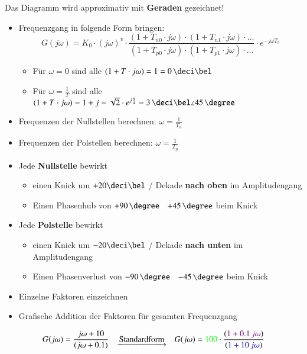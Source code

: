 Das Diagramm wird approximativ mit \textbf{Geraden} gezeichnet!

\begin{itemize}
    \item Frequenzgang in folgende Form bringen:
        $$ G(j \omega) = K_0 \cdot (j \omega)^v \cdot \frac{(1 + T_{n0} \cdot j \omega)\cdot (1 + T_{n1} \cdot j \omega) \cdot \ldots}
        {(1 + T_{p0} \cdot j \omega)\cdot (1 + T_{p1} \cdot j \omega) \cdot \ldots} \cdot e^{- j \omega T_t} $$
    \begin{itemize}
        \item Für $\omega = 0$ sind alle $(1 + T \cdot j \omega) = 1 = 0 \, \deci \bel$
        \item Für $\omega = \frac{1}{T}$ sind alle  $(1 + T \cdot j \omega) = 1 + j = \sqrt{2} \cdot e^{j \frac{\pi}{4}} 
            = 3 \, \deci \bel \angle 45 \, \degree$
    \end{itemize}
    \item Frequenzen der Nullstellen berechnen: $\omega = \frac{1}{T_n}$
    \item Frequenzen der Polstellen berechnen: $\omega = \frac{1}{T_p}$


    \item Jede \textbf{Nullstelle} bewirkt
    \begin{itemize}
        \item einen Knick um $+ 20 \deci \bel$ / Dekade \textbf{nach oben} im Amplitudengang
        \item Einen Phasenhub von $+ 90 \, \degree$ \textrightarrow\ $+ 45 \, \degree$ beim Knick
    \end{itemize}
    \item Jede \textbf{Polstelle} bewirkt
    \begin{itemize}
        \item einen Knick um $- 20 \deci \bel$ / Dekade \textbf{nach unten} im Amplitudengang
        \item Einen Phasenverlust von $- 90 \, \degree$ \textrightarrow\ $- 45 \, \degree$ beim Knick
    \end{itemize}
    \item Einzelne Faktoren einzeichnen
    \item Grafische Addition der Faktoren für gesamten Frequenzgang
\end{itemize}



$$ G(j \omega) = \frac{j \omega + 10}{(j \omega + 0.1)} \quad  \underrightarrow{\text{ Standardform }} \quad 
  G(j \omega) = {\color{green}100} \cdot \frac{({\color{violet}1 + 0.1 \, j \omega})}{({\color{blue} 1 + 10 \, j \omega})} $$

